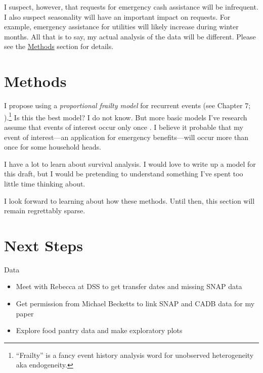 \documentclass[12pt,letterpaperpaper,]{book}
\providecommand{\tightlist}{%
  \setlength{\itemsep}{0pt}\setlength{\parskip}{0pt}}
\begin{document}
I suspect, however, that requests for emergency cash assistance will be
infrequent. I also suspect seasonality will have an important impact on
requests. For example, emergency assistance for utilities will likely
increase during winter months. All that is to say, my actual analysis of
the data will be different. Please see the
\protect\hyperlink{methods-3}{Methods} section for details.

\newpage

\hypertarget{methods-3}{\section*{Methods}\label{methods-3}}

I propose using a \emph{proportional frailty model} for recurrent events
(see Chapter 7; \citet{aalen_survival_2008}).\footnote{``Frailty'' is a
  fancy event history analysis word for unobserved heterogeneity aka
  endogeneity.} Is this the best model? I do not know. But more basic
models I've research assume that events of interest occur only once
\citep{singer_applied_2003}. I believe it probable that my event of
interest---an application for emergency benefits---will occur more than
once for some household heads.

I have a lot to learn about survival analysis. I would love to write up
a model for this draft, but I would be pretending to understand
something I've spent too little time thinking about.

I look forward to learning about how these methods. Until then, this
section will remain regrettably sparse.

\newpage

\section*{Next Steps}\label{next-steps-1}

Data

\begin{itemize}
\tightlist
\item
  Meet with Rebecca at DSS to get transfer dates and missing SNAP data
\item
  Get permission from Michael Becketts to link SNAP and CADB data for my
  paper
\item
  Explore food pantry data and make exploratory plots
\end{itemize}
\end{document}
